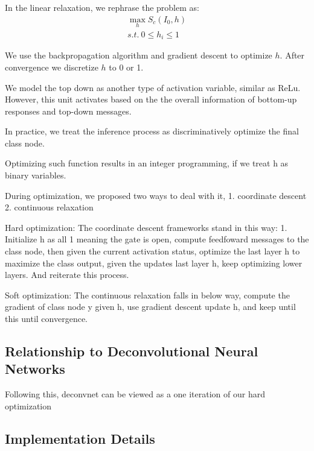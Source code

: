 In the linear relaxation, we rephrase the problem as:
\begin{equation}
\begin{aligned}
  \max_h S_c(I_0, h) \\
  s.t.\ 0 \leq h_i \leq 1
\end{aligned}
\end{equation}

We use the backpropagation algorithm and gradient descent to optimize $h$. After convergence we discretize $h$ to 0 or 1.

We model the top down as another type of activation variable, similar as ReLu. However, this unit activates based on the the overall information of bottom-up responses and top-down messages. 

In practice, we treat the inference process as discriminatively optimize the final class node. 

Optimizing such function results in an integer programming, if we treat h as binary variables. 

During optimization, we proposed two ways to deal with it, 1. coordinate descent 2. continuous relaxation

Hard optimization: The coordinate descent frameworks stand in this way: 1. Initialize h as all 1 meaning the gate is open, compute feedfoward messages to the class node, then given the current activation status, optimize the last layer h to maximize the class output, given the updates last layer h, keep optimizing lower layers. And reiterate this process.

Soft optimization: The continuous relaxation falls in below way, compute the gradient of class node y given h, use gradient descent update h, and keep until this until convergence.

\subsection{Relationship to Deconvolutional Neural Networks}

Following this, deconvnet can be viewed as a one iteration of our hard optimization

\subsection{Implementation Details}
